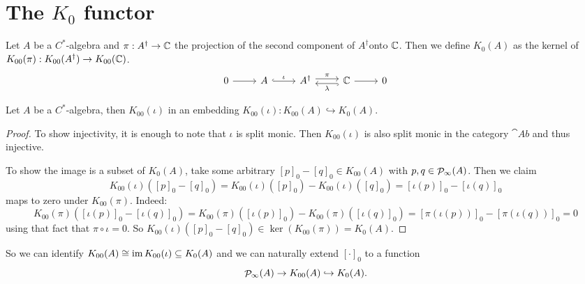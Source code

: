 \section{The $K_{0}$ functor}
\begin{definition}
Let $A$ be a $C^*$-algebra and $\pi: A^\dagger \to \mathbb{C}$ the projection of the second component of $A^\dagger$onto $\mathbb{C}$. Then we define $K_0(A)$ as the kernel of $K_{00}(\pi): K_{00}(A^\dagger)\to K_{00}(\mathbb{C})$.
\[ \begin{tikzcd}
0 \rar & A \rar[hook, "\iota"] & A^\dagger \rar[shift left, "\pi"] & \lar[hook, shift left, "\lambda"] \C \rar & 0
\end{tikzcd} \]
\end{definition}
\begin{proposition} \label{prop:K00embedsIntoK0}
Let $A$ be a $C^*$-algebra, then $K_{00}(\iota)$ in an embedding $K_{00}(\iota): K_{00}(A) \hookrightarrow K_{0}(A)$.
\end{proposition}
\begin{proof}
To show injectivity, it is enough to note that $\iota$ is split monic. Then $K_{00}(\iota)$ is also split monic in the category $\cat{Ab}$ and thus injective.

To show the image is a subset of $K_0(A)$, take some arbitrary $[p]_0-[q]_0\in K_{00}(A)$ with  $p,q\in\mathop{\mathcal{P}}\nolimits_\infty(A)$. Then we claim 
\[K_{00}(\iota)([p]_0-[q]_0) = K_{00}(\iota)([p]_0)-K_{00}(\iota)([q]_0) =  [\iota(p)]_0-[\iota(q)]_0\]
maps to zero under $K_{00}(\pi)$. Indeed:
\[ K_{00}(\pi)([\iota(p)]_0-[\iota(q)]_0) = K_{00}(\pi)([\iota(p)]_0) - K_{00}(\pi)([\iota(q)]_0) = [\pi(\iota(p))]_0 - [\pi(\iota(q))]_0 = 0 \]
using that fact that $\pi\circ\iota = 0$. So $K_{00}(\iota)([p]_0-[q]_0)\in\ker(K_{00}(\pi)) = K_0(A)$.
\end{proof}
So we can identify $K_{00}(A) \cong \operatorname{im} K_{00}(\iota) \subseteq K_0(A)$ and we can naturally extend $[\cdot]_{0}$ to a function
\[ \mathop{\mathcal{P}}\nolimits_\infty(A)\to K_{00}(A) \hookrightarrow K_0(A). \]

